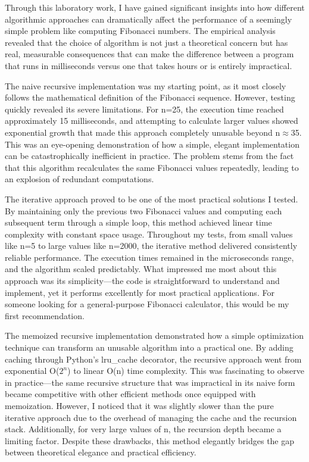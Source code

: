 \documentclass[12pt]{article}
\begin{document}
\hspace{0.8cm} Through this laboratory work, I have gained significant insights into how different algorithmic approaches can dramatically affect the performance of a seemingly simple problem like computing Fibonacci numbers. The empirical analysis revealed that the choice of algorithm is not just a theoretical concern but has real, measurable consequences that can make the difference between a program that runs in milliseconds versus one that takes hours or is entirely impractical.

The naive recursive implementation was my starting point, as it most closely follows the mathematical definition of the Fibonacci sequence. However, testing quickly revealed its severe limitations. For n=25, the execution time reached approximately 15 milliseconds, and attempting to calculate larger values showed exponential growth that made this approach completely unusable beyond n$\approx$35. This was an eye-opening demonstration of how a simple, elegant implementation can be catastrophically inefficient in practice. The problem stems from the fact that this algorithm recalculates the same Fibonacci values repeatedly, leading to an explosion of redundant computations.

The iterative approach proved to be one of the most practical solutions I tested. By maintaining only the previous two Fibonacci values and computing each subsequent term through a simple loop, this method achieved linear time complexity with constant space usage. Throughout my tests, from small values like n=5 to large values like n=2000, the iterative method delivered consistently reliable performance. The execution times remained in the microseconds range, and the algorithm scaled predictably. What impressed me most about this approach was its simplicity—the code is straightforward to understand and implement, yet it performs excellently for most practical applications. For someone looking for a general-purpose Fibonacci calculator, this would be my first recommendation.

The memoized recursive implementation demonstrated how a simple optimization technique can transform an unusable algorithm into a practical one. By adding caching through Python's lru\_cache decorator, the recursive approach went from exponential O($2^n$) to linear O(n) time complexity. This was fascinating to observe in practice—the same recursive structure that was impractical in its naive form became competitive with other efficient methods once equipped with memoization. However, I noticed that it was slightly slower than the pure iterative approach due to the overhead of managing the cache and the recursion stack. Additionally, for very large values of n, the recursion depth became a limiting factor. Despite these drawbacks, this method elegantly bridges the gap between theoretical elegance and practical efficiency.
\end{document}
